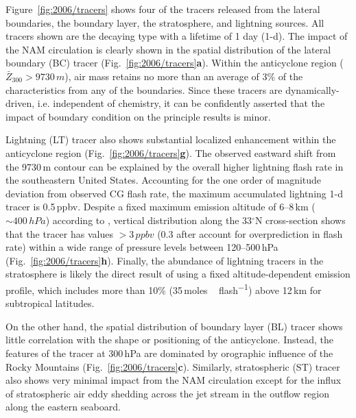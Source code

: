 Figure~\ref{fig:2006/tracers} shows four of the tracers released from the lateral boundaries, the boundary layer, the stratosphere, and
lightning sources. All tracers shown are the decaying type with a lifetime of 1 day (1-d). The impact of the NAM circulation is clearly shown
in the spatial distribution of the lateral boundary (BC) tracer (Fig.~\ref{fig:2006/tracers}{\bf a}). Within the anticyclone region ($\bar{Z}_{300}
>9730\,\unit{m}$), air mass retains no more than an average of 3\% of the characteristics from any of the boundaries. Since these
tracers are dynamically-driven, i.e. independent of chemistry, it can be confidently asserted that the impact of boundary condition on the principle results is minor.

Lightning (LT) tracer also shows substantial localized enhancement within the anticyclone region (Fig.~\ref{fig:2006/tracers}{\bf g}).
The observed eastward shift from the 9730\,\unit{m} contour can be explained by the overall higher lightning flash rate in the southeastern 
United States. Accounting for the one order of magnitude deviation from observed CG flash rate, the maximum accumulated lightning
1-d tracer is 0.5\,\unit{ppbv}. Despite a fixed maximum emission altitude of 6--8\,\unit{km} ($\sim400\,\unit{hPa}$) according to
\citet{Ott:2010lo}, vertical distribution along the 33$^\circ$N cross-section shows that the tracer has values $>3\,\unit{ppbv}$ (0.3
after account for overprediction in flash rate) within a wide range of pressure levels between 120--500\,\unit{hPa}
(Fig.~\ref{fig:2006/tracers}{\bf h}). Finally, the abundance of lightning tracers in the stratosphere is likely the direct result of using a
fixed altitude-dependent emission profile, which includes more than 10\% (35\,\unit{moles\,flash^{-1}}) above 12\,\unit{km} for
subtropical latitudes.

On the other hand, the spatial distribution of boundary layer (BL) tracer shows little correlation with the shape or positioning of the anticyclone. Instead,
the features of the tracer at 300\,\unit{hPa} are dominated by orographic influence of the Rocky Mountains (Fig.~\ref{fig:2006/tracers}{\bf c}).
Similarly, stratospheric (ST) tracer also shows very minimal impact from the NAM circulation except for the influx of stratospheric air eddy
shedding across the jet stream in the outflow region along the eastern seaboard.



